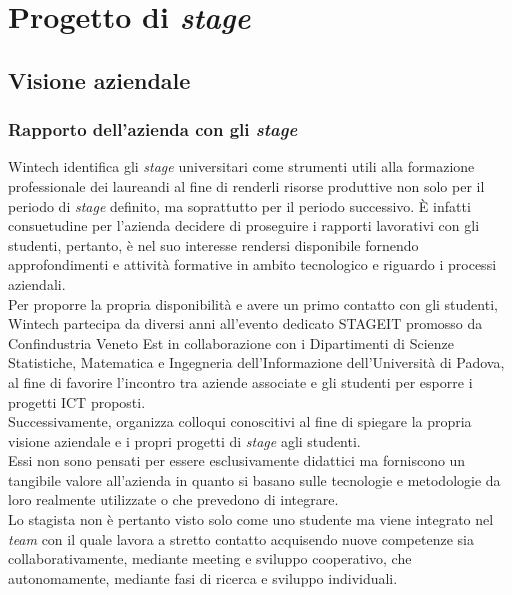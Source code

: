 \chapter{Progetto di \emph{stage}}
\label{cap:progettoDiStage}

\section{Visione aziendale}
\subsection{Rapporto dell'azienda con gli \emph{stage}}
Wintech identifica gli \emph{stage} universitari come strumenti utili alla formazione professionale dei laureandi al fine di renderli risorse produttive non solo per il periodo di \emph{stage} definito, ma soprattutto per il periodo successivo. È infatti consuetudine per l'azienda decidere di proseguire i rapporti lavorativi con gli studenti, pertanto, è nel suo interesse rendersi disponibile fornendo approfondimenti e attività formative in ambito tecnologico e riguardo i processi aziendali.\\
Per proporre la propria disponibilità e avere un primo contatto con gli studenti, Wintech partecipa da diversi anni all'evento dedicato STAGEIT promosso da Confindustria Veneto Est in collaborazione con i Dipartimenti di Scienze Statistiche, Matematica e Ingegneria dell'Informazione dell'Università di Padova, al fine di favorire l'incontro tra aziende associate e gli studenti per esporre i progetti \gls{ICT} proposti.\\
Successivamente, organizza colloqui conoscitivi al fine di spiegare la propria visione aziendale e i propri progetti di \emph{stage} agli studenti.\\
Essi non sono pensati per essere esclusivamente didattici ma forniscono un tangibile valore all'azienda in quanto si basano sulle tecnologie e metodologie da loro realmente utilizzate o che prevedono di integrare.\\
Lo stagista non è pertanto visto solo come uno studente ma viene integrato nel \emph{team} con il quale lavora a stretto contatto acquisendo nuove competenze sia collaborativamente, mediante meeting e sviluppo cooperativo, che autonomamente, mediante fasi di ricerca e sviluppo individuali.\\

